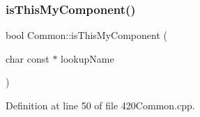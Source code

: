 \mbox{\label{class_common_a0192d295366bf1e966d8b58a3ce57554}} 
\subsubsection{\texorpdfstring{is\+This\+My\+Component()}{isThisMyComponent()}\hspace{0.1cm}{\footnotesize\ttfamily [1/2]}}
{\footnotesize\ttfamily bool Common\+::is\+This\+My\+Component (\begin{DoxyParamCaption}\item[{char const $\ast$}]{lookup\+Name }\end{DoxyParamCaption})}



Definition at line 50 of file 420\+Common.\+cpp.

